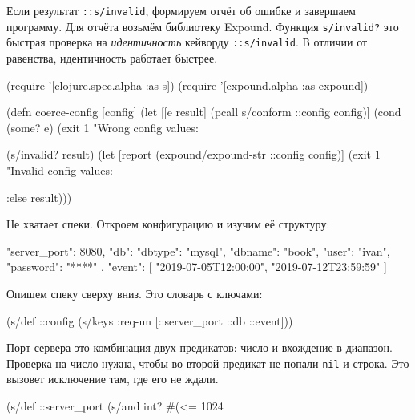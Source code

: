 Если результат \verb|::s/invalid|, формируем отчёт об ошибке и завершаем
программу. Для отчёта возьмём библиотеку Expound. Функция \verb|s/invalid?| это
быстрая проверка на \emph{идентичность} кейворду \verb|::s/invalid|. В отличии
от равенства, идентичность работает быстрее.

\begin{english}
  \begin{clojure}
(require '[clojure.spec.alpha :as s])
(require '[expound.alpha :as expound])

(defn coerce-config [config]
  (let [[e result] (pcall s/conform ::config config)]
    (cond
      (some? e)
      (exit 1 "Wrong config values: %

      (s/invalid? result)
      (let [report (expound/expound-str ::config config)]
        (exit 1 "Invalid config values: %

      :else result)))
  \end{clojure}
\end{english}

Не хватает спеки. Откроем конфигурацию и изучим её структуру:


\begin{english}
  \begin{json}
{
    "server_port": 8080,
    "db": {
        "dbtype":   "mysql",
        "dbname":   "book",
        "user":     "ivan",
        "password": "****"
    },
    "event": [
        "2019-07-05T12:00:00",
        "2019-07-12T23:59:59"
    ]
}
  \end{json}
\end{english}

\noindent
Опишем спеку сверху вниз. Это словарь с ключами:

\begin{english}
  \begin{clojure}
(s/def ::config
  (s/keys :req-un [::server_port ::db ::event]))
  \end{clojure}
\end{english}


Порт сервера это комбинация двух предикатов: число и вхождение в диапазон.
Проверка на число нужна, чтобы во второй предикат не попали \verb|nil| и
строка. Это вызовет исключение там, где его не ждали.

\begin{english}
  \begin{clojure}
(s/def ::server_port
  (s/and int? #(<= 1024 %
  \end{clojure}
\end{english}

